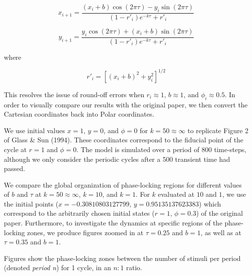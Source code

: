 \begin{equation}
    x_{i+1} = \frac{(x_i + b)\cos(2\pi\tau) - y_i \sin(2\pi\tau)}{(1 - r'_i)e^{-k\tau}+r'_i}
    \label{eqn:7}
\end{equation}

\begin{equation}
    y_{i+1} = \frac{y_i \cos(2\pi\tau) + (x_i + b) \sin(2\pi\tau)}{(1-r'_i)e^{-k\tau} + r'_i}
    \label{eqn:8}
\end{equation}

where

\begin{equation}
    r'_i = [(x_i + b)^2 + y^2_i]^{1/2} \nonumber 
\end{equation}

This resolves the issue of round-off errors when $r_i \approx 1$, $b \approx 1$, and $\phi_i \approx 0.5$. In order to visually compare our results with the original paper, we then convert the Cartesian coordinates back into Polar coordinates.

We use initial values $x = 1$, $y = 0$, and $\phi = 0$ for $k=50\approx \infty$ to replicate Figure 2 of Glass \& Sun (1994)\supercite{GLASS1994}. These coordinates correspond to the fiducial point of the cycle at $r = 1$ and $\phi = 0$. The model is simulated over a period of 800 time-steps, although we only consider the periodic cycles after a 500 transient time had passed.

We compare the global organization of phase-locking regions for different values of $b$ and $\tau$ at $k=50\approx \infty$, $k = 10$, and $k = 1$. For $k$ evaluated at $10$ and $1$, we use the initial points ($x = -0.30810803127799$, $y = 0.95135137623383$) which correspond to the arbitrarily chosen initial states ($r = 1$, $\phi = 0.3$) of the original paper. Furthermore, to investigate the dynamics at specific regions of the phase-locking zones, we produce figures zoomed in at $\tau = 0.25$ and $b = 1$, as well as at $\tau = 0.35$ and $b = 1$.

Figures show the phase-locking zones between the number of stimuli per period (denoted \emph{period n}) for 1 cycle, in an $n:1$ ratio.

